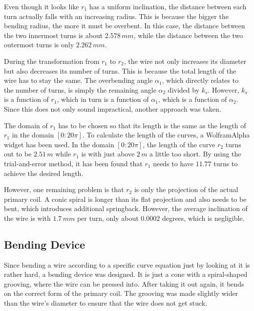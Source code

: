 Even though it looks like \(r_1\) has a uniform inclination, the distance between each turn actually falls with an increasing radius. This is because the bigger the bending radius, the more it must be overbent. In this case, the distance between the two innermost turns is about \(2.578\,mm\), while the distance between the two outermost turns is only \(2.262\,mm\).

During the transformation from \(r_1\) to \(r_2\), the wire not only increases its diameter but also decreases its number of turns. This is because the total length of the wire has to stay the same. The overbending angle \(\alpha_1\), which directly relates to the number of turns, is simply the remaining angle \(\alpha_2\) divided by \(k_s\). However, \(k_s\) is a function of \(r_1\), which in turn is a function of \(\alpha_1\), which is a function of \(\alpha_2\). Since this does not only sound impractical, another approach was taken.

The domain of \(r_1\) has to be chosen so that its length is the same as the length of \(r_1\) in the domain \([0:20\pi]\). To calculate the length of the curves, a WolframAlpha widget has been used. In the domain \([0:20\pi]\), the length of the curve \(r_2\) turns out to be \(2.51\,m\) while \(r_1\) is with just above \(2\,m\) a little too short. By using the trial-and-error method, it has been found that \(r_1\) needs to have \(11.77\) turns to achieve the desired length.

However, one remaining problem is that \(r_2\) is only the projection of the actual primary coil. A conic spiral is longer than its flat projection and also needs to be bent, which introduces additional springback. However, the average inclination of the wire is with \(1.7\,mm\) per turn, only about \(0.0002\) degrees, which is negligible.

\subsection{Bending Device}

Since bending a wire according to a specific curve equation just by looking at it is rather hard, a bending device was designed. It is just a cone with a spiral-shaped grooving, where the wire can be pressed into. After taking it out again, it bends on the correct form of the primary coil. The grooving was made slightly wider than the wire’s diameter to ensure that the wire does not get stuck.

